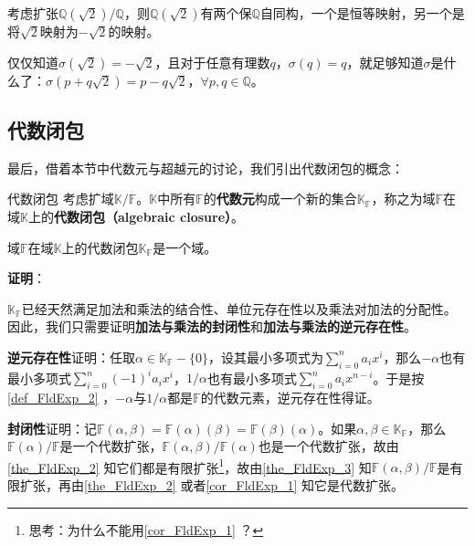 \begin{example}{}
考虑扩张$\mathbb{Q}(\sqrt{2})/\mathbb{Q}$，则$\mathbb{Q}(\sqrt{2})$有两个保$\mathbb{Q}$自同构，一个是恒等映射，另一个是将$\sqrt{2}$映射为$-\sqrt{2}$的映射。

仅仅知道$\sigma(\sqrt{2})=-\sqrt{2}$，且对于任意有理数$q$，$\sigma(q)=q$，就足够知道$\sigma$是什么了：$\sigma(p+q\sqrt{2})=p-q\sqrt{2}$，$\forall p, q\in\mathbb{Q}$。
\end{example}








\subsection{代数闭包}

最后，借着本节中代数元与超越元的讨论，我们引出代数闭包的概念：


\begin{definition}{代数闭包}
考虑扩域$\mathbb{K}/\mathbb{F}$。$\mathbb{K}$中所有$\mathbb{F}$的\textbf{代数元}构成一个新的集合$\mathbb{K}_{\mathbb{F}}$，称之为域$\mathbb{F}$在域$\mathbb{K}$上的\textbf{代数闭包（algebraic closure）}。
\end{definition}

\begin{theorem}{}

域$\mathbb{F}$在域$\mathbb{K}$上的代数闭包$\mathbb{K}_{\mathbb{F}}$是一个域。

\end{theorem}

\textbf{证明}：

$\mathbb{K}_{\mathbb{F}}$已经天然满足加法和乘法的结合性、单位元存在性以及乘法对加法的分配性。因此，我们只需要证明\textbf{加法与乘法的封闭性}和\textbf{加法与乘法的逆元存在性}。

\textbf{逆元存在性}证明：任取$\alpha\in\mathbb{K}_{\mathbb{F}}-\{0\}$，设其最小多项式为$\sum_{i=0}^{n}a_ix^i$，那么$-\alpha$也有最小多项式$\sum_{i=0}^n(-1)^ia_ix^i$，$1/\alpha$也有最小多项式$\sum_{i=0}^na_ix^{n-i}$。于是按\autoref{def_FldExp_2} ，$-\alpha$与$1/\alpha$都是$\mathbb{F}$的代数元素，逆元存在性得证。

\textbf{封闭性}证明：记$\mathbb{F}(\alpha, \beta)=\mathbb{F}(\alpha)(\beta)=\mathbb{F}(\beta)(\alpha)$。如果$\alpha,\beta\in\mathbb{K}_{\mathbb{F}}$，那么$\mathbb{F}(\alpha)/\mathbb{F}$是一个代数扩张，$\mathbb{F}(\alpha, \beta)/\mathbb{F}(\alpha)$也是一个代数扩张，故由\autoref{the_FldExp_2} 知它们都是有限扩张\footnote{思考：为什么不能用\autoref{cor_FldExp_1} ？}，故由\autoref{the_FldExp_3} 知$\mathbb{F}(\alpha, \beta)/\mathbb{F}$是有限扩张，再由\autoref{the_FldExp_2} 或者\autoref{cor_FldExp_1} 知它是代数扩张。

